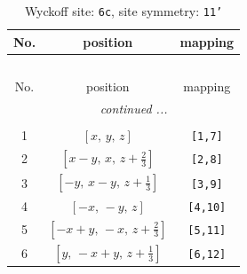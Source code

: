 \documentclass[fleqn,8pt]{jsarticle}
\begin{document}
\renewcommand{\arraystretch}{1.2}
\begin{longtable}{ccc}
\caption{Wyckoff site: {\tt 6c}, site symmetry: {\tt 11'}}
 \\
 \hline \hline
No. & position & mapping \\ \hline \endfirsthead

\multicolumn{2}{l}{\tablename\ \thetable{}} \\
 \hline \hline
No. & position & mapping \\ \hline \endhead

 \hline \hline
\multicolumn{2}{r}{\footnotesize\it continued ...} \\ \endfoot

 \hline \hline
\multicolumn{2}{r}{} \\ \endlastfoot

1 & $\left[ x,\, y,\, z \right]$ & {\tt [1,7]} \\ \hline
2 & $\left[ x - y,\, x,\, z + \frac{2}{3} \right]$ & {\tt [2,8]} \\ \hline
3 & $\left[ - y,\, x - y,\, z + \frac{1}{3} \right]$ & {\tt [3,9]} \\ \hline
4 & $\left[ - x,\, - y,\, z \right]$ & {\tt [4,10]} \\ \hline
5 & $\left[ - x + y,\, - x,\, z + \frac{2}{3} \right]$ & {\tt [5,11]} \\ \hline
6 & $\left[ y,\, - x + y,\, z + \frac{1}{3} \right]$ & {\tt [6,12]} \\
\end{longtable}
\end{document}
